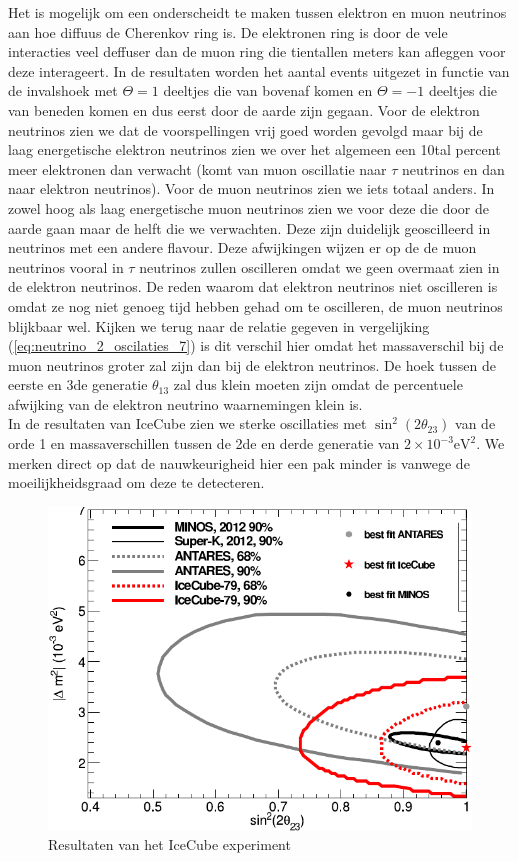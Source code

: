 \documentclass[../main.tex]{subfiles}
\begin{document}
Het is mogelijk om een onderscheidt te maken tussen elektron en muon neutrinos aan hoe diffuus de Cherenkov ring is. De elektronen ring is door de vele interacties veel deffuser dan de muon ring die tientallen meters kan afleggen voor deze interageert. In de resultaten worden het aantal events uitgezet in functie van de invalshoek met $\Theta = 1$ deeltjes die van bovenaf komen en $\Theta = -1$ deeltjes die van beneden komen en dus eerst door de aarde zijn gegaan. Voor de elektron neutrinos zien we dat de voorspellingen vrij goed worden gevolgd maar bij de laag energetische elektron neutrinos zien we over het algemeen een 10tal percent meer elektronen dan verwacht (komt van muon oscillatie naar $\tau$ neutrinos en dan naar elektron neutrinos). Voor de muon neutrinos zien we iets totaal anders. In zowel hoog als laag energetische muon neutrinos zien we voor deze die door de aarde gaan maar de helft die we verwachten. Deze zijn duidelijk geoscilleerd in neutrinos met een andere flavour. Deze afwijkingen wijzen er op de de muon neutrinos vooral in $\tau$ neutrinos zullen oscilleren omdat we geen overmaat zien in de elektron neutrinos. De reden waarom dat elektron neutrinos niet oscilleren is omdat ze nog niet genoeg tijd hebben gehad om te oscilleren, de muon neutrinos blijkbaar wel. Kijken we terug naar de relatie gegeven in vergelijking (\ref{eq:neutrino_2_oscilaties_7}) is dit verschil hier omdat het massaverschil bij de muon neutrinos groter zal zijn dan bij de elektron neutrinos. De hoek tussen de eerste en 3de generatie $\theta_{13}$ zal dus klein moeten zijn omdat de percentuele afwijking van de elektron neutrino waarnemingen klein is.\\
In de resultaten van IceCube zien we sterke oscillaties met $\sin^2(2\theta_{23})$ van de orde 1 en massaverschillen tussen de 2de en derde generatie van $2\times 10^{-3}\text{eV}^2$. We merken direct op dat de nauwkeurigheid hier een pak minder is vanwege de moeilijkheidsgraad om deze te detecteren.

\begin{figure}[h]
    \centering
    \includegraphics[width=0.5\linewidth]{neutrinos/icecube.png}
    \caption{Resultaten van het IceCube experiment}%
    \label{fig:neutrinos/icecube}
\end{figure}
\end{document}
